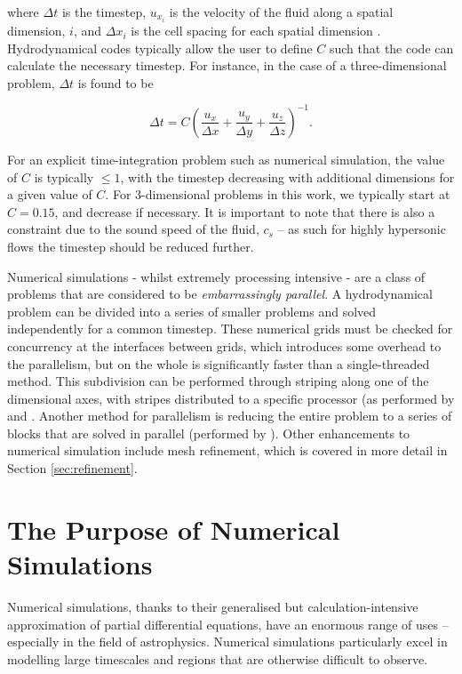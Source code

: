\noindent
where $\Delta t$ is the timestep, $u_{x_i}$ is the velocity of the fluid along a spatial dimension, $i$, and $\Delta x_i$ is the cell spacing for each spatial dimension \parencite[Ch.~5]{toro_riemann_2013}.
Hydrodynamical codes typically allow the user to define $C$ such that the code can calculate the necessary timestep.
For instance, in the case of a three-dimensional problem, $\Delta t$ is found to be

\begin{equation}
  \Delta t = C \left( \frac{u_x}{\Delta x} + \frac{u_y}{\Delta y} + \frac{u_z}{\Delta z} \right)^{-1} .
\end{equation}

\noindent
For an explicit time-integration problem such as numerical simulation, the value of $C$ is typically $\leq 1$, with the timestep decreasing with additional dimensions for a given value of $C$.
For 3-dimensional problems in this work, we typically start at $C = 0.15$, and decrease if necessary.
It is important to note that there is also a constraint due to the sound speed of the fluid, $c_s$ -- as such for highly hypersonic flows the timestep should be reduced further.

Numerical simulations - whilst extremely processing intensive - are a class of problems that are considered to be \emph{embarrassingly parallel}.
A hydrodynamical problem can be divided into a series of smaller problems and solved independently for a common timestep.
These numerical grids must be checked for concurrency at the interfaces between grids, which introduces some overhead to the parallelism, but on the whole is significantly faster than a single-threaded method.
This subdivision can be performed through striping along one of the dimensional axes, with stripes distributed to a specific processor (as performed by \mg{} and .
Another method for parallelism is reducing the entire problem to a series of blocks that are solved in parallel (performed by \athena). 
Other enhancements to numerical simulation include mesh refinement, which is covered in more detail in Section \ref{sec:refinement}.

\section{The Purpose of Numerical Simulations}
\label{sec:numerical-purpose}

Numerical simulations, thanks to their generalised but calculation-intensive approximation of partial differential equations, have an enormous range of uses -- especially in the field of astrophysics.
Numerical simulations particularly excel in modelling large timescales and regions that are otherwise difficult to observe.


